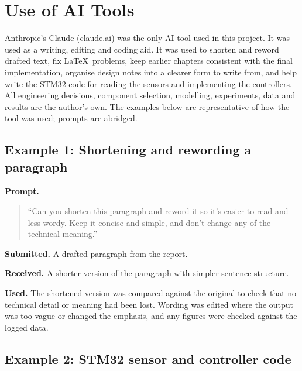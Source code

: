 \chapter{Use of AI Tools}
\label{app:ai}

Anthropic's Claude (claude.ai) was the only AI tool used in this project. It was used as a writing, editing and coding aid. It was used to shorten and reword drafted text, fix \LaTeX\ problems, keep earlier chapters consistent with the final implementation, organise design notes into a clearer form to write from, and help write the STM32 code for reading the sensors and implementing the controllers. All engineering decisions, component selection, modelling, experiments, data and results are the author's own. The examples below are representative of how the tool was used; prompts are abridged.

\section{Example 1: Shortening and rewording a paragraph}
\label{app:ai-ex1}

\textbf{Prompt.}
\begin{quote}\small
``Can you shorten this paragraph and reword it so it's easier to read and less wordy. Keep it concise and simple, and don't change any of the technical meaning.''
\end{quote}

\textbf{Submitted.} A drafted paragraph from the report.

\textbf{Received.} A shorter version of the paragraph with simpler sentence structure.

\textbf{Used.} The shortened version was compared against the original to check that no technical detail or meaning had been lost. Wording was edited where the output was too vague or changed the emphasis, and any figures were checked against the logged data.

\section{Example 2: STM32 sensor and controller code}
\label{app:ai-ex2}

